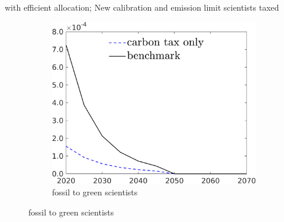 \documentclass[11pt,aspectratio=169]{beamer}
\begin{document}
\begin{frame}{with efficient allocation; New calibration and emission limit scientists taxed}
\begin{figure}[h!!]
\begin{subfigure}{0.3\textwidth}
		\end{subfigure}
	\begin{subfigure}{0.3\textwidth}		
	\caption{{fossil to green scientists}}
	\includegraphics[width=1\textwidth]{../codding_model/own_basedOnFried/optimalPol_010922_revision/figures/all_13Sept22/NewCalib_pol_T_sffsg_emnet1_Sun2_spillover0_knspil3_xgr0_nsk0_sep0_extern0_PV1_etaa0.79_lgd1.png}
\end{subfigure}
	\end{figure}
\end{frame}
\end{document}
